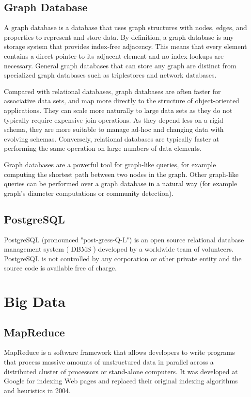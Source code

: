 \documentclass[12pt]{article}
\begin{document}

\subsection{Graph Database}
A graph database is a database that uses graph structures with nodes, edges, and properties to represent and store data. By definition, a graph database is any storage system that provides index-free adjacency. This means that every element contains a direct pointer to its adjacent element and no index lookups are necessary. General graph databases that can store any graph are distinct from specialized graph databases such as triplestores and network databases.

Compared with relational databases, graph databases are often faster for associative data sets, and map more directly to the structure of object-oriented applications. They can scale more naturally to large data sets as they do not typically require expensive join operations. As they depend less on a rigid schema, they are more suitable to manage ad-hoc and changing data with evolving schemas. Conversely, relational databases are typically faster at performing the same operation on large numbers of data elements.

Graph databases are a powerful tool for graph-like queries, for example computing the shortest path between two nodes in the graph. Other graph-like queries can be performed over a graph database in a natural way (for example graph's diameter computations or community detection).

\subsection{PostgreSQL}
PostgreSQL (pronounced "post-gress-Q-L") is an open source relational database management system ( DBMS ) developed by a worldwide team of volunteers. PostgreSQL is not controlled by any corporation or other private entity and the source code is available free of charge.

\section{Big Data}
\subsection{MapReduce}
MapReduce is a software framework that allows developers to write programs that process massive amounts of unstructured data in parallel across a distributed cluster of processors or stand-alone computers. It was developed at Google for indexing Web pages and replaced their original indexing algorithms and heuristics in 2004.
\end{document}
